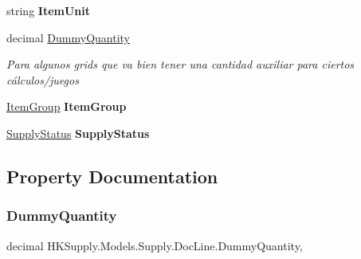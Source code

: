 \begin{DoxyCompactItemize}
\item 
\mbox{\label{class_h_k_supply_1_1_models_1_1_supply_1_1_doc_line_a5037775a91543f65303f9277334cbe3d}} 
string {\bfseries Item\+Unit}
\item 
decimal \mbox{\hyperlink{class_h_k_supply_1_1_models_1_1_supply_1_1_doc_line_aaff88766d02c0bf4a0c5606bb35bd7d9}{Dummy\+Quantity}}
\begin{DoxyCompactList}\small\item\em Para algunos grids que va bien tener una cantidad auxiliar para ciertos cálculos/juegos \end{DoxyCompactList}\item 
\mbox{\label{class_h_k_supply_1_1_models_1_1_supply_1_1_doc_line_a42f540de502b21bd0670a9ea786bf441}} 
\mbox{\hyperlink{class_h_k_supply_1_1_models_1_1_item_group}{Item\+Group}} {\bfseries Item\+Group}
\item 
\mbox{\label{class_h_k_supply_1_1_models_1_1_supply_1_1_doc_line_a42dc3fd925df96a4d8187a02ad7e6ecc}} 
\mbox{\hyperlink{class_h_k_supply_1_1_models_1_1_supply_1_1_supply_status}{Supply\+Status}} {\bfseries Supply\+Status}
\end{DoxyCompactItemize}


\subsection{Property Documentation}
\mbox{\label{class_h_k_supply_1_1_models_1_1_supply_1_1_doc_line_aaff88766d02c0bf4a0c5606bb35bd7d9}} 
\subsubsection{\texorpdfstring{Dummy\+Quantity}{DummyQuantity}}
{\footnotesize\ttfamily decimal H\+K\+Supply.\+Models.\+Supply.\+Doc\+Line.\+Dummy\+Quantity\hspace{0.3cm}{\ttfamily [get]}, {\ttfamily [set]}}



